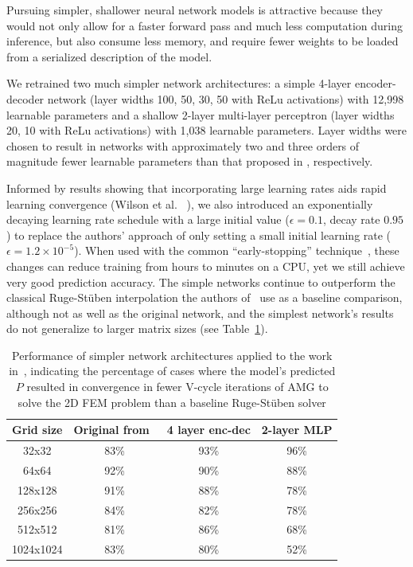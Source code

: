 \documentclass{svproc}
\newcommand{\etal}{et al. }
\begin{document}
Pursuing simpler, shallower neural network models is attractive because they would not only allow for a faster forward pass and much less computation during inference, but also consume less memory, and require fewer weights to be loaded from a serialized description of the model.

We retrained two much simpler network architectures: a simple 4-layer encoder-decoder network (layer widths 100, 50, 30, 50 with ReLu activations) with 12,998 learnable parameters and a shallow 2-layer multi-layer perceptron (layer widths 20, 10 with ReLu activations) with 1,038 learnable parameters. Layer widths were chosen to result in networks with approximately two and three orders of magnitude fewer learnable parameters than that proposed in \cite{Greenfeld2019}, respectively. 

Informed by results showing that incorporating large learning rates aids rapid learning convergence (Wilson \etal~\cite{wilson2017marginal}), we also introduced an exponentially decaying learning rate schedule with a large initial value ($\epsilon=0.1$, decay rate $0.95$) to replace the authors' approach of only setting a small initial learning rate ($\epsilon=1.2 \times 10^{-5}$). When used with the common ``early-stopping'' technique~\cite{prechelt1998early}, these changes can reduce training from hours to minutes on a CPU, yet we still achieve very good prediction accuracy. The simple networks continue to outperform the classical Ruge-St\"uben interpolation the authors of~\cite{Greenfeld2019} use as a baseline comparison, although not as well as the original network, and the simplest network's results do not generalize to larger matrix sizes (see Table~\ref{tab:simpler-nn-results}).

\begin{table}[]
    \caption{Performance of simpler network architectures applied to the work in~\cite{Greenfeld2019}, indicating the percentage of cases where the model's predicted $P$ resulted in convergence in fewer V-cycle iterations of AMG to solve the 2D FEM problem than a baseline Ruge-St\"uben solver}
    \centering
    \begin{tabular}{c c c c}
         Grid size &  Original from~\cite{Greenfeld2019} & \hspace{3mm} 4 layer enc-dec & \hspace{3mm} 2-layer MLP\\ \hline
         32x32 & 83\% & 93\% & 96\% \\         
         64x64 & 92\%  & 90\% & 88\%\\         
         128x128 & 91\% & 88\% & 78\% \\
         256x256 & 84\% &   82\% & 78\%\\
         512x512&  81\% & 86\%   & 68\%\\
         1024x1024&  83\% & 80\% & 52\%
    \end{tabular}
    \label{tab:simpler-nn-results}
\end{table}
\end{document}
